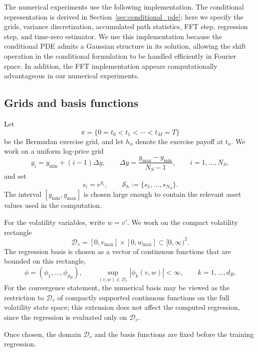 \documentclass[pdflatex,sn-mathphys-num]{sn-jnl}
\theoremstyle{thmstyleone}%
\theoremstyle{thmstylethree}%
\theoremstyle{thmstyletwo}%
\begin{document}
The numerical experiments use the following implementation. The conditional
representation is derived in Section~\ref{sec:conditional_pde}; here we specify the grids, variance discretization, accumulated path statistics, FFT step, regression step, and time-zero estimator. We use this implementation because the conditional PDE admits a Gaussian structure in its solution, allowing the shift operation in the conditional formulation to be handled efficiently in Fourier space. In addition, the FFT implementation appears computationally advantageous in our numerical experiments.





\subsection{Grids and basis functions}
Let
$$
\pi=\{0=t_0<t_1<\cdots<t_M=T\}
$$
be the Bermudan exercise grid, and let $h_n$ denote the exercise payoff at
$t_n$. We work on a uniform log-price grid
$$
y_i=y_{\min}+(i-1)\Delta y,
\qquad
\Delta y=\frac{y_{\max}-y_{\min}}{N_S-1},
\qquad
i=1,\ldots,N_S,
$$
and set
$$
s_i=e^{y_i},
\qquad
\mathcal S_h:=\{s_1,\ldots,s_{N_S}\}.
$$
The interval $[y_{\min},y_{\max}]$ is chosen large enough to contain the
relevant asset values used in the computation.

For the volatility variables, write $w=v'$. We work on the compact volatility rectangle
\begin{equation}\label{eq:vol-domain}
\mathcal D_v=[0,v_{\max}]\times[0,w_{\max}]\subset[0,\infty)^2 .
\end{equation}
The regression basis is chosen as a vector of continuous functions that are bounded on this rectangle,
\begin{equation}\label{eq:vol-basis}
\phi=(\phi_1,\ldots,\phi_{d_B}), \qquad \sup_{(v,w)\in\mathcal D_v}|\phi_k(v,w)|<\infty,
\qquad k=1,\ldots,d_B.
\end{equation}
For the convergence statement, the numerical basis may be viewed as the restriction to $\mathcal D_v$ of compactly supported continuous functions on the full volatility state space; this extension does not affect the computed regression, since the regression is evaluated only on $\mathcal D_v$.

Once chosen, the domain $\mathcal D_v$ and the basis functions are fixed before
the training regression.
\end{document}
